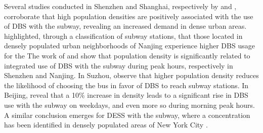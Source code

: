 \begin{refsegment}
Several studies conducted in Shenzhen and Shanghai, respectively by \textcolor{blue}{\textcite[6]{wang_relationship_2020}} and \textcolor{blue}{\textcite[31]{lin_analysis_2019}}, corroborate that high population densities are positively associated with the use of \acrshort{DBS} with the subway, revealing an increased demand in dense urban areas. \textcolor{blue}{\textcite[16]{li_operating_2019}} highlighted, through a classification of subway stations, that those located in densely populated urban neighborhoods of Nanjing experience higher \acrshort{DBS} usage for the  The work of \textcolor{blue}{\textcite[25]{guo_dockless_2021}} and \textcolor{blue}{\textcite[184]{cheng_exploring_2022}} show that population density is significantly related to integrated use of \acrshort{DBS} with the subway during peak hours, respectively in Shenzhen and Nanjing. In Suzhou, \textcolor{blue}{\textcite[24]{li_integration_2020}} observe that higher population density reduces the likelihood of choosing the bus in favor of \acrshort{DBS} to reach subway stations. In Beijing, \textcolor{blue}{\textcite[11]{liu_temporal_2022}} reveal that a 10\% increase in density leads to a significant rise in \acrshort{DBS} use with the subway on weekdays, and even more so during morning peak hours. A similar conclusion emerges for \acrshort{DESS} with the subway, where a concentration has been identified in densely populated areas of New York City \textcolor{blue}{\autocite[16]{lee_forecasting_2021}}.%


\end{refsegment}
